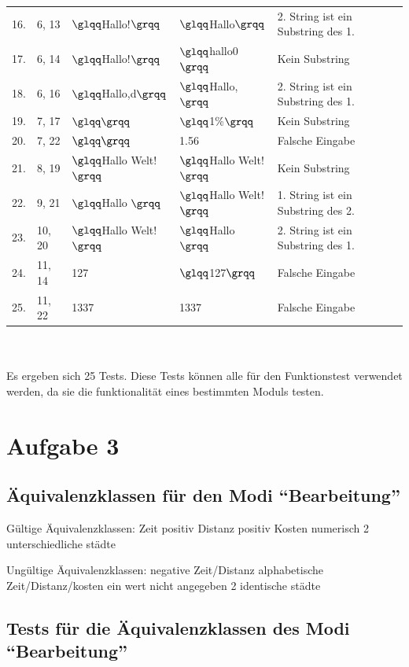 \documentclass[a4paper]{report}
\begin{document}
\begin{tabular}{l|l|ll|l}
16.			& 6, 13				& $\glqq$Hallo!$\grqq$		& $\glqq$Hallo$\grqq$		& 2. String ist ein Substring des 1.\\
17.			& 6, 14				& $\glqq$Hallo!$\grqq$		& $\glqq$hallo0$\grqq$		& Kein Substring\\
18.			& 6, 16				& $\glqq$Hallo,d$\grqq$		& $\glqq$Hallo,$\grqq$		& 2. String ist ein Substring des 1.\\
19.			& 7, 17				& $\glqq \grqq$				& $\glqq$1\%$\grqq$			& Kein Substring\\
20.			& 7, 22				& $\glqq \grqq$				& 1.56						& Falsche Eingabe\\
21.			& 8, 19				& $\glqq$Hallo Welt!$\grqq$& $\glqq$Hallo Welt!$\grqq$& Kein Substring\\
22.			& 9, 21				& $\glqq$Hallo $\grqq$		& $\glqq$Hallo Welt!$\grqq$& 1. String ist ein Substring des 2.\\
23.			& 10, 20			& $\glqq$Hallo Welt!$\grqq$& $\glqq$Hallo $\grqq$		& 2. String ist ein Substring des 1.\\
24.			& 11, 14			& 127						& $\glqq$127$\grqq$			& Falsche Eingabe\\
25.			& 11, 22			& 1337						& 1337						& Falsche Eingabe\\
\end{tabular} \\ \\
Es ergeben sich 25 Tests. Diese Tests können alle für den Funktionstest verwendet werden, da sie die funktionalität eines bestimmten Moduls testen. \\

\newpage
\section*{Aufgabe 3}
\subsection*{Äquivalenzklassen für den Modi ``Bearbeitung''}
Gültige Äquivalenzklassen:
Zeit positiv
Distanz positiv
Kosten numerisch
2 unterschiedliche städte


Ungültige Äquivalenzklassen:
negative Zeit/Distanz
alphabetische Zeit/Distanz/kosten
ein wert nicht angegeben
2 identische städte

\subsection*{Tests für die Äquivalenzklassen des Modi ``Bearbeitung''}
\end{document}
